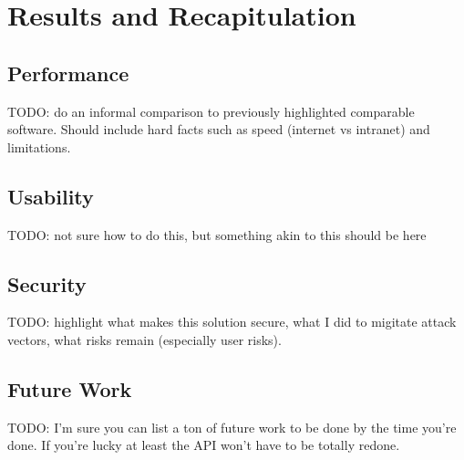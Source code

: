 \chapter{Results and Recapitulation}


\section{Performance}

TODO: do an informal comparison to previously highlighted comparable software.
Should include hard facts such as speed (internet vs intranet) and limitations.

\section{Usability}

TODO: not sure how to do this, but something akin to this should be here

\section{Security}

TODO: highlight what makes this solution secure, what I did to migitate attack vectors, what risks remain (especially user risks).

\section{Future Work}

TODO: I'm sure you can list a ton of future work to be done by the time you're done.
If you're lucky at least the API won't have to be totally redone.
